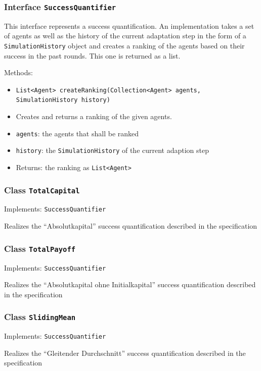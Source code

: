 \documentclass[parskip=full,11pt]{scrartcl}
\begin{document}
\subsubsection{Interface \texttt{SuccessQuantifier}}

This interface represents a success quantification. An implementation takes a set of agents as well as the history of the current adaptation step in the form of a \texttt{SimulationHistory} object and creates a ranking of the agents based on their success in the past rounds. This one is returned as a list.

Methods:
\begin{itemize}\itemsep -10pt
\item \texttt{List<Agent> createRanking(Collection<Agent> agents, SimulationHistory history)}
\item[] Creates and returns a ranking of the given agents.
\item[] \texttt{agents}: the agents that shall be ranked
\item[] \texttt{history}: the \texttt{SimulationHistory} of the current adaption step
\item[] Returns: the ranking as \texttt{List<Agent>}
\end{itemize}

\subsubsection{Class \texttt{TotalCapital}}
Implements: \texttt{SuccessQuantifier}

Realizes the \enquote{Absolutkapital} success quantification described in the specification

\subsubsection{Class \texttt{TotalPayoff}}
Implements: \texttt{SuccessQuantifier}

Realizes the \enquote{Absolutkapital ohne Initialkapital} success quantification described in the specification

\subsubsection{Class \texttt{SlidingMean}}
Implements: \texttt{SuccessQuantifier}

Realizes the \enquote{Gleitender Durchschnitt} success quantification described in the specification
\end{document}

